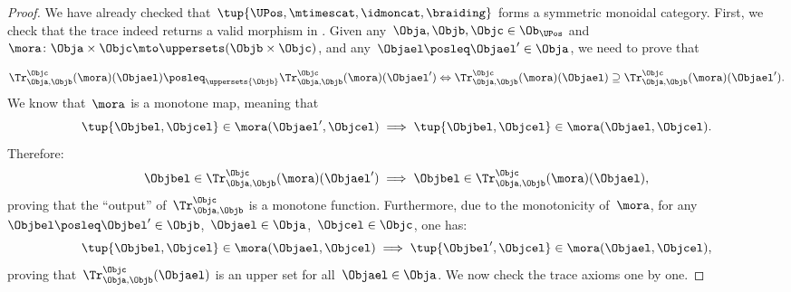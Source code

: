\begin{proof}
    We have already checked that~$\tup{\UPos,\mtimescat, \idmoncat,\braiding}$ forms a symmetric monoidal category.
    First, we check that the trace indeed returns a valid morphism in \UPos.
    Given any~$\Obja,\Objb,\Objc\in \Ob_{\UPos}$ and~$\mora\colon \Obja\times \Objc \mto \uppersets(\Objb\times \Objc)$,
    and any~$\Objael\posleq \Objael'\in \Obja$, we need to prove that

    \begin{equation*}
        \Tr_{\Obja,\Objb}^{\Objc}(\mora)(\Objael) \posleq_{\uppersets{\Objb}}  \Tr_{\Obja,\Objb}^{\Objc}(\mora)(\Objael') \Leftrightarrow \Tr_{\Obja,\Objb}^{\Objc}(\mora)(\Objael) \supseteq \Tr_{\Obja,\Objb}^{\Objc}(\mora)(\Objael').
    \end{equation*}
    We know that~$\mora$ is a monotone map, meaning that
    \begin{equation*}
        \tup{\Objbel,\Objcel} \in \mora(\Objael',\Objcel) \implies \tup{\Objbel,\Objcel}\in \mora(\Objael,\Objcel).
    \end{equation*}
    Therefore:
    \begin{equation*}
        \Objbel \in \Tr_{\Obja,\Objb}^{\Objc}(\mora)(\Objael') \implies \Objbel \in \Tr_{\Obja,\Objb}^{\Objc}(\mora)(\Objael),
    \end{equation*}
    proving that the ``output'' of~$\Tr_{\Obja,\Objb}^{\Objc}$ is a monotone function.
    Furthermore, due to the monotonicity of~$\mora$, for any~$\Objbel\posleq \Objbel'\in \Objb$,~$\Objael\in \Obja$,~$\Objcel \in \Objc$, one has:
    \begin{equation*}
        \tup{\Objbel,\Objcel}\in \mora(\Objael,\Objcel)\implies \tup{\Objbel',\Objcel}\in \mora(\Objael,\Objcel),
    \end{equation*}
    proving that~$\Tr_{\Obja,\Objb}^{\Objc}(\Objael)$ is an upper set for all~$\Objael\in \Obja$.
    We now check the trace axioms one by one.


\end{proof}
